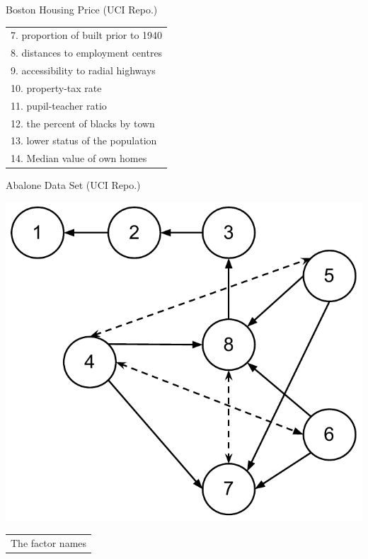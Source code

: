 \begin{frame}{Boston Housing Price (UCI Repo.)}
\begin{minipage}[t]{0.4\linewidth}
\begin{scriptsize}
\begin{tabular}{|l|}
    7. proportion of built prior to 1940 \\
    8. distances to employment centres \\
    9. accessibility to radial highways \\
    10. property-tax rate\\
    11. pupil-teacher ratio\\
    12. the percent of blacks by town\\
    13. lower status of the population \\
    14. Median value of own homes\\
\hline
\end{tabular}
\end{scriptsize}
\end{minipage}
\end{frame}
\begin{frame}{Abalone Data Set (UCI Repo.)}
\begin{minipage}[t]{0.45\linewidth}
 \vspace{0pt}
\centering
\includegraphics[width=\textwidth]{imgs/AbaloneNetwork}
\end{minipage}\hfill
\begin{minipage}[t]{0.45\linewidth}
 \vspace{0pt}
\centering
\begin{scriptsize}
\begin{tabular}{|l|}
\hline
The factor names\\

\end{tabular}
\end{scriptsize}
\end{minipage}
\end{frame}
